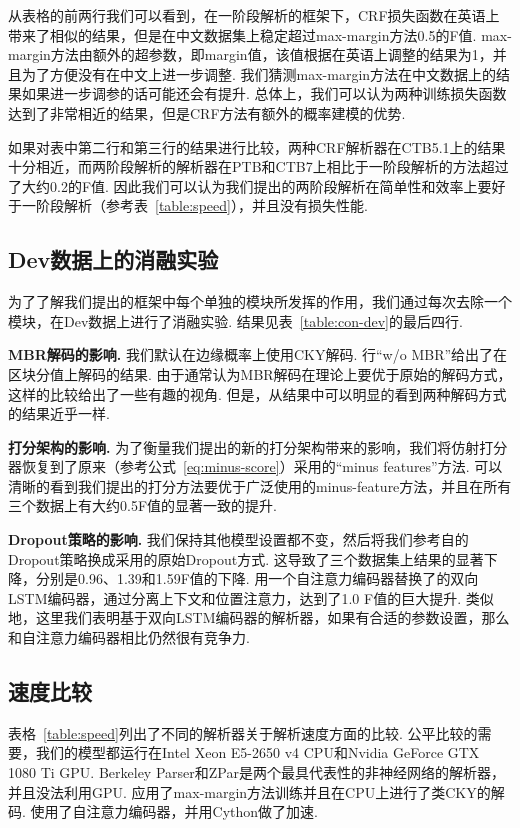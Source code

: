 从表格的前两行我们可以看到，在一阶段解析的框架下，CRF损失函数在英语上带来了相似的结果，但是在中文数据集上稳定超过max-margin方法0.5的F值.
max-margin方法由额外的超参数，即margin值，该值根据在英语上调整的结果为1，并且为了方便没有在中文上进一步调整.
我们猜测max-margin方法在中文数据上的结果如果进一步调参的话可能还会有提升.
总体上，我们可以认为两种训练损失函数达到了非常相近的结果，但是CRF方法有额外的概率建模的优势.

如果对表中第二行和第三行的结果进行比较，两种CRF解析器在CTB5.1上的结果十分相近，而两阶段解析的解析器在PTB和CTB7上相比于一阶段解析的方法超过了大约0.2的F值.
因此我们可以认为我们提出的两阶段解析在简单性和效率上要好于一阶段解析（参考表~\ref{table:speed}），并且没有损失性能.




\subsection{Dev数据上的消融实验}

为了了解我们提出的框架中每个单独的模块所发挥的作用，我们通过每次去除一个模块，在Dev数据上进行了消融实验.
结果见表~\ref{table:con-dev}的最后四行.

\noindent\textbf{MBR解码的影响.}
我们默认在边缘概率上使用CKY解码.
行``w/o MBR''给出了在区块分值上解码的结果.
由于通常认为MBR解码在理论上要优于原始的解码方式，这样的比较给出了一些有趣的视角.
但是，从结果中可以明显的看到两种解码方式的结果近乎一样.

\noindent\textbf{打分架构的影响.}
为了衡量我们提出的新的打分架构带来的影响，我们将仿射打分器恢复到了原来\cite{stern-etal-2017-minimal}（参考公式~\ref{eq:minus-score}）采用的``minus features''方法.
可以清晰的看到我们提出的打分方法要优于广泛使用的minus-feature方法，并且在所有三个数据上有大约0.5F值的显著一致的提升.

\noindent\textbf{Dropout策略的影响.}
我们保持其他模型设置都不变，然后将我们参考自\cite{Timothy-d17-biaffine}的Dropout策略换成\cite{stern-etal-2017-minimal}采用的原始Dropout方式.
这导致了三个数据集上结果的显著下降，分别是0.96、1.39和1.59F值的下降.
\cite{kitaev-klein-2018-constituency}用一个自注意力编码器替换了\cite{stern-etal-2017-minimal}的双向LSTM编码器，通过分离上下文和位置注意力，达到了1.0 F值的巨大提升.
类似地，这里我们表明基于双向LSTM编码器的解析器，如果有合适的参数设置，那么和自注意力编码器相比仍然很有竞争力.

\subsection{速度比较}
表格~\ref{table:speed}列出了不同的解析器关于解析速度方面的比较.
公平比较的需要，我们的模型都运行在Intel Xeon E5-2650 v4 CPU和Nvidia GeForce GTX 1080 Ti GPU.
Berkeley Parser和ZPar是两个最具代表性的非神经网络的解析器，并且没法利用GPU.
\cite{stern-etal-2017-minimal}应用了max-margin方法训练并且在CPU上进行了类CKY的解码.
\cite{kitaev-klein-2018-constituency}使用了自注意力编码器，并用Cython做了加速.


